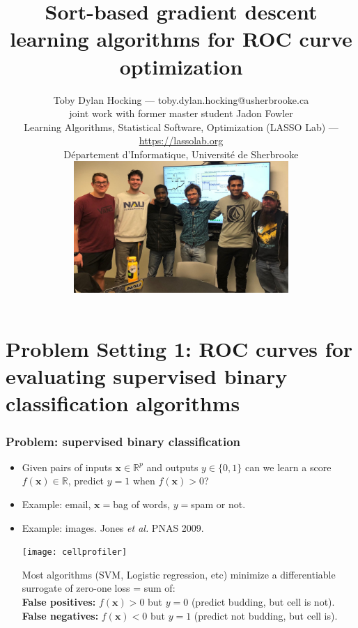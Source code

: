\documentclass[t]{beamer}
\begin{document}
\title{Sort-based gradient descent learning algorithms for ROC curve optimization}

\author{
  Toby Dylan Hocking --- toby.dylan.hocking@usherbrooke.ca\\ 
  joint work with former master student Jadon Fowler\\
  Learning Algorithms, Statistical Software, Optimization (LASSO Lab) --- \url{https://lassolab.org}\\
  Département d'Informatique, Université de Sherbrooke\\
  \includegraphics[height=5cm]{2023-02-02-group-meeting} \\
}

\date{}

\maketitle

\section{Problem Setting 1: ROC curves for evaluating supervised  binary classification algorithms}

\begin{frame}
  \frametitle{Problem: supervised binary classification}
  
  \begin{itemize}
  \item Given pairs of inputs $\mathbf x\in\mathbb R^p$ and outputs
    $y\in\{0,1\}$ can we learn a score 
    $f(\mathbf x)\in\mathbb R$, predict $y=1$ when $f(\mathbf x)>0$?
  \item Example: email, $\mathbf x =$bag of words, $y=$spam or not.
  \item Example: images. Jones {\it et al.} PNAS 2009.
    \parbox{2in}{\texttt{[image: cellprofiler]}}
    \parbox{1.9in}{Most algorithms (SVM, Logistic regression, etc) minimize a differentiable surrogate of zero-one loss = sum of:\\
      \textbf{False positives:} $f(\mathbf x)>0$ but $y=0$ (predict
      budding, but cell is not).\\
      \textbf{False negatives:} $f(\mathbf x)<0$ but $y=1$ (predict
      not budding, but cell is).  }
  \end{itemize} 
\end{frame}
\end{document}
